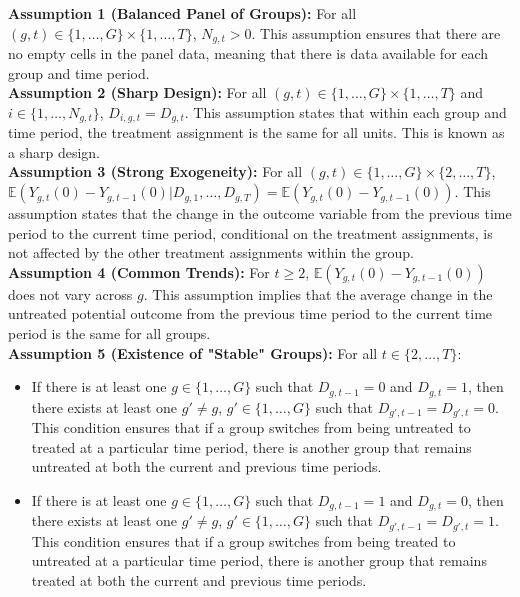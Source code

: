 \documentclass[10pt, oneside]{book}
\begin{document}
\textbf{Assumption 1 (Balanced Panel of Groups):} For all $(g,t) \in \{1, \ldots, G\} \times \{1, \ldots, T\}$, $N_{g,t} > 0$. This assumption ensures that there are no empty cells in the panel data, meaning that there is data available for each group and time period. \\

\textbf{Assumption 2 (Sharp Design):} For all $(g,t) \in \{1, \ldots, G\} \times \{1, \ldots, T\}$ and $i \in \{1, \ldots, N_{g,t}\}$, $D_{i,g,t} = D_{g,t}$. This assumption states that within each group and time period, the treatment assignment is the same for all units. This is known as a sharp design. \\

\textbf{Assumption 3 (Strong Exogeneity):} For all $(g,t) \in \{1, \ldots, G\} \times \{2, \ldots, T\}$, $\mathbb{E}(Y_{g,t}(0) - Y_{g,t-1}(0) | D_{g,1}, \ldots, D_{g,T}) = \mathbb{E}(Y_{g,t}(0) - Y_{g,t-1}(0))$. This assumption states that the change in the outcome variable from the previous time period to the current time period, conditional on the treatment assignments, is not affected by the other treatment assignments within the group. \\

\textbf{Assumption 4 (Common Trends):} For $t \geq 2$, $\mathbb{E}(Y_{g,t}(0) - Y_{g,t-1}(0))$ does not vary across $g$. This assumption implies that the average change in the untreated potential outcome from the previous time period to the current time period is the same for all groups. \\

\textbf{Assumption 5 (Existence of "Stable" Groups):} For all $t \in \{2, \ldots, T\}$:
\begin{itemize}
    \item If there is at least one $g \in \{1, \ldots, G\}$ such that $D_{g,t-1} = 0$ and $D_{g,t} = 1$, then there exists at least one $g' \neq g$, $g' \in \{1, \ldots, G\}$ such that $D_{g',t-1} = D_{g',t} = 0$. This condition ensures that if a group switches from being untreated to treated at a particular time period, there is another group that remains untreated at both the current and previous time periods.
    \item If there is at least one $g \in \{1, \ldots, G\}$ such that $D_{g,t-1} = 1$ and $D_{g,t} = 0$, then there exists at least one $g' \neq g$, $g' \in \{1, \ldots, G\}$ such that $D_{g',t-1} = D_{g',t} = 1$. This condition ensures that if a group switches from being treated to untreated at a particular time period, there is another group that remains treated at both the current and previous time periods.
\end{itemize}
\end{document}
